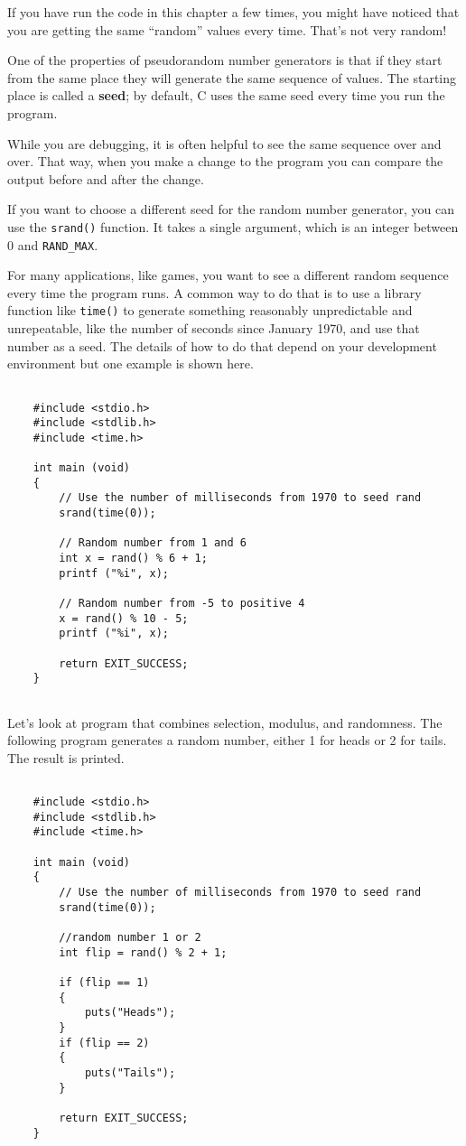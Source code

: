 If you have run the code in this chapter a few times, you might
have noticed that you are getting the same ``random'' values
every time.  That's not very random!

One of the properties of pseudorandom number generators is that
if they start from the same place they will generate
the same sequence of values.  The starting place is called
a {\bf seed}; by default, C uses
the same seed every time you run the program.

While you are debugging, it is often helpful to
see the same sequence over and over.  That way, when you make
a change to the program you can compare the output before and
after the change.

If you want to choose a different seed for the random number
generator, you can use the {\tt srand()} function.  It takes
a single argument, which is an integer between 0 and {\tt RAND\_MAX}.

For many applications, like games, you want to see a different
random sequence every time the program runs.  A common way to
do that is to use a library function like {\tt time()}
to generate something reasonably unpredictable
and unrepeatable, like the number of seconds since January
1970, and use that number as a seed.  The details
of how to do that depend on your development environment but one example is shown here.

\begin{verbatim}

    #include <stdio.h>
    #include <stdlib.h>
    #include <time.h>
     
    int main (void)
    {
        // Use the number of milliseconds from 1970 to seed rand
        srand(time(0)); 
           	
        // Random number from 1 and 6 
        int x = rand() % 6 + 1;
        printf ("%i", x);
        
        // Random number from -5 to positive 4
        x = rand() % 10 - 5;
        printf ("%i", x);
        
        return EXIT_SUCCESS;
    }
	
\end{verbatim}


Let's look at program that combines selection, modulus, and randomness. The following program generates a random number, either 1 for heads or 2 for tails. The result is printed.

\begin{verbatim}

    #include <stdio.h>
    #include <stdlib.h>
    #include <time.h>
    
    int main (void)
    {
        // Use the number of milliseconds from 1970 to seed rand
        srand(time(0)); 
        
        //random number 1 or 2
        int flip = rand() % 2 + 1;

        if (flip == 1)
        {
            puts("Heads");
        }
        if (flip == 2)
        {
            puts("Tails");
        }
	
 	    return EXIT_SUCCESS;
    }
	
\end{verbatim}




